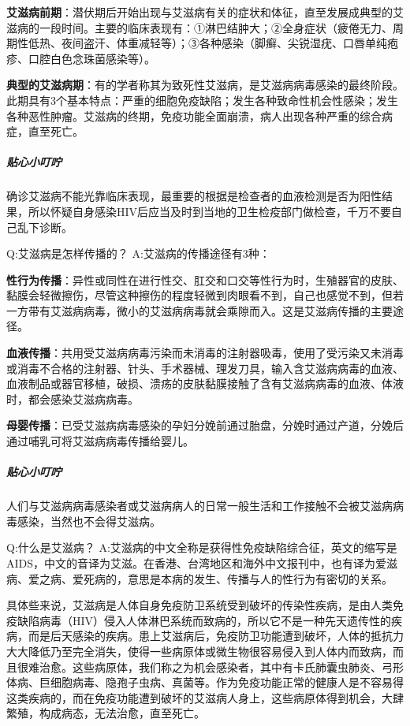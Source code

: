 \documentclass[12pt,UTF8]{ctexbook}
\begin{document}
\textbf{艾滋病前期}：潜伏期后开始出现与艾滋病有关的症状和体征，直至发展成典型的艾滋病的一段时间。主要的临床表现有：①淋巴结肿大；②全身症状（疲倦无力、周期性低热、夜间盗汗、体重减轻等）；③各种感染（脚癣、尖锐湿疣、口唇单纯疱疹、口腔白色念珠菌感染等）。

\textbf{典型的艾滋病期}：有的学者称其为致死性艾滋病，是艾滋病病毒感染的最终阶段。此期具有3个基本特点：严重的细胞免疫缺陷；发生各种致命性机会性感染；发生各种恶性肿瘤。艾滋病的终期，免疫功能全面崩溃，病人出现各种严重的综合病症，直至死亡。

\subparagraph{贴心小叮咛}

确诊艾滋病不能光靠临床表现，最重要的根据是检查者的血液检测是否为阳性结果，所以怀疑自身感染HIV后应当及时到当地的卫生检疫部门做检查，千万不要自己乱下诊断。

Q:艾滋病是怎样传播的？
A:艾滋病的传播途径有3种：

\textbf{性行为传播}：异性或同性在进行性交、肛交和口交等性行为时，生殖器官的皮肤、黏膜会轻微擦伤，尽管这种擦伤的程度轻微到肉眼看不到，自己也感觉不到，但若一方带有艾滋病病毒，微小的艾滋病病毒就会乘隙而入。这是艾滋病传播的主要途径。

\textbf{血液传播}：共用受艾滋病病毒污染而未消毒的注射器吸毒，使用了受污染又未消毒或消毒不合格的注射器、针头、手术器械、理发刀具，输入含艾滋病病毒的血液、血液制品或器官移植，破损、溃疡的皮肤黏膜接触了含有艾滋病病毒的血液、体液时，都会感染艾滋病病毒。

\textbf{母婴传播}：已受艾滋病病毒感染的孕妇分娩前通过胎盘，分娩时通过产道，分娩后通过哺乳可将艾滋病病毒传播给婴儿。

\subparagraph{贴心小叮咛}

人们与艾滋病病毒感染者或艾滋病病人的日常一般生活和工作接触不会被艾滋病病毒感染，当然也不会得艾滋病。

Q:什么是艾滋病？
A:艾滋病的中文全称是获得性免疫缺陷综合征，英文的缩写是AIDS，中文的音译为艾滋。在香港、台湾地区和海外中文报刊中，也有译为爱滋病、爱之病、爱死病的，意思是本病的发生、传播与人的性行为有密切的关系。

具体些来说，艾滋病是人体自身免疫防卫系统受到破坏的传染性疾病，是由人类免疫缺陷病毒（HIV）侵入人体淋巴系统而致病的，所以它不是一种先天遗传性的疾病，而是后天感染的疾病。患上艾滋病后，免疫防卫功能遭到破坏，人体的抵抗力大大降低乃至完全消失，使得一些病原体或微生物很容易侵入到人体内而致病，而且很难治愈。这些病原体，我们称之为机会感染者，其中有卡氏肺囊虫肺炎、弓形体病、巨细胞病毒、隐孢子虫病、真菌等。作为免疫功能正常的健康人是不容易得这类疾病的，而在免疫功能遭到破坏的艾滋病人身上，这些病原体得到机会，大肆繁殖，构成病态，无法治愈，直至死亡。
\end{document}
